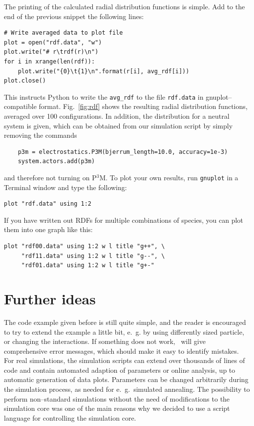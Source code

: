 \documentclass[
a4paper,                        %
11pt,                           %
twoside,                        %
footsepline,                    %
headsepline,                    %
headexclude,                    %
footexclude,                    %
pagesize,                       %
]{scrartcl}
\begin{document}
The printing of the calculated radial distribution functions is
simple. Add to the end of the previous snippet the following lines:

\begin{lstlisting}
# Write averaged data to plot file
plot = open("rdf.data", "w")
plot.write("# r\trdf(r)\n")
for i in xrange(len(rdf)):
    plot.write("{0}\t{1}\n".format(r[i], avg_rdf[i]))
plot.close()
\end{lstlisting}

This instructs Python to write the \verb|avg_rdf| to the
file \verb|rdf.data| in gnuplot--compatible format. Fig.~\ref{fig:rdf}
shows the resulting radial distribution functions, averaged over 100
configurations. In addition, the distribution for a neutral system is
given, which can be obtained from our simulation script by simply
removing the commands

\begin{lstlisting}
    p3m = electrostatics.P3M(bjerrum_length=10.0, accuracy=1e-3)
    system.actors.add(p3m)
\end{lstlisting}

and therefore not turning on P$^3$M.
To plot your own results, run \verb|gnuplot| in a Terminal window
and type the following:
\begin{lstlisting}
plot "rdf.data" using 1:2	
\end{lstlisting}
If you have written out RDFs for multiple combinations of species,
you can plot them into one graph like this:
\begin{lstlisting}
plot "rdf00.data" using 1:2 w l title "g++", \
     "rdf11.data" using 1:2 w l title "g--", \
     "rdf01.data" using 1:2 w l title "g+-"	
\end{lstlisting}


\section{Further ideas}

The code example given before is still quite simple, and the reader is
encouraged to try to extend the example a little bit, e.~g. by using
differently sized particle, or changing the interactions. If something
does not work, \es\ will give comprehensive error messages, which
should make it easy to identify mistakes. For real simulations, the
simulation scripts can extend over thousands of lines of code and
contain automated adaption of parameters or online analysis, up to
automatic generation of data plots.  Parameters can be changed
arbitrarily during the simulation process, as needed for e.~g.\
simulated annealing. The possibility to perform non--standard
simulations without the need of modifications to the simulation core
was one of the main reasons why we decided to use a script language
for controlling the simulation core.
\end{document}

